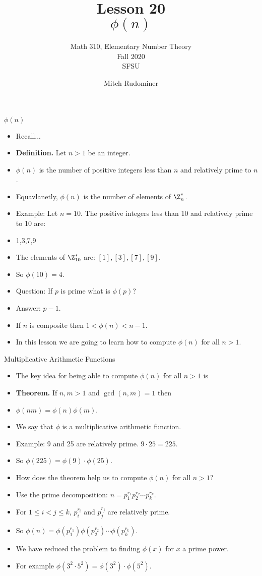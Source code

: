 \documentclass{beamer}
\title{Lesson 20 \\ $\phi(n)$}
\subtitle{Math 310, Elementary Number Theory \\ Fall 2020 \\ SFSU}
\author{Mitch Rudominer}
\date{}
\begin{document}
\begin{frame}
  \titlepage
\end{frame}

\begin{frame}{$\phi(n)$}

\begin{itemize}
  \item Recall...
  \item \textbf{Definition.} Let $n>1$ be an integer.
  \item $\phi(n)$ is the number of positive integers less than $n$ and relatively prime to $n$.
  \item Equavlanetly, $\phi(n)$ is the number of elements of $\Z_n^*$.
  \item Example: Let $n=10$. The positive integers less than 10 and relatively prime to 10 are:
  \item 1,3,7,9
  \item The elements of $\Z_{10}^*$ are: $[1], [3], [7], [9]$.
  \item So $\phi(10) = 4$.
  \item Question: If $p$ is prime what is $\phi(p)$?
  \item Answer: $p-1$.
  \item If $n$ is composite then $1<\phi(n)<n-1$.
  \item In this lesson we are going to learn how to compute $\phi(n)$ for all $n>1$.
\end{itemize}

\end{frame}

\begin{frame}{Multiplicative Arithmetic Functions}

\begin{itemize}
  \item The key idea for being able to compute $\phi(n)$ for all $n>1$ is
  \item \textbf{Theorem.} If $n,m>1$ and $\gcd(n,m)=1$ then
  \item $\phi(nm) = \phi(n)\phi(m)$.
  \item We say that $\phi$ is a multiplicative arithmetic function.
  \item Example: 9 and 25 are relatively prime. $9\cdot 25 = 225$.
  \item So $\phi(225) = \phi(9) \cdot \phi(25)$.
  \item How does the theorem help us to compute $\phi(n)$ for all $n>1$?
  \item Use the prime decomposition: $n=p_1^{r_1}p_2^{r_2}\cdots p_k^{r_k}$.
  \item For $1\leq i < j \leq k$, $p_i^{r_i}$ and $p_j^{r_j}$ are relatively prime.
  \item So  $\phi(n)=\phi(p_1^{r_1})\phi(p_2^{r_2})\cdots \phi(p_k^{r_k})$.
  \item We have reduced the problem to finding $\phi(x)$ for $x$ a prime power.
  \item For example $\phi(3^2\cdot 5^2) = \phi(3^2) \cdot \phi(5^2)$.
\end{itemize}

\end{frame}
\end{document}
